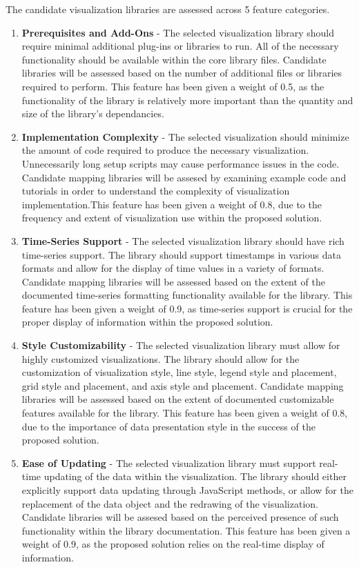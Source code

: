 \documentclass{report}
\begin{document}
The candidate visualization libraries are assessed across 5 feature categories.

\begin{enumerate}

\item \textbf{Prerequisites and Add-Ons} - The selected visualization library should require minimal additional plug-ins or libraries to run. All of the necessary functionality should be available within the core library files. Candidate libraries will be assessed based on the number of additional files or libraries required to perform. This feature has been given a weight of 0.5, as the functionality of the library is relatively more important than the quantity and size of the library's dependancies.

\item \textbf{Implementation Complexity} - The selected visualization should minimize the amount of code required to produce the necessary visualization. Unnecessarily long setup scripts may cause performance issues in the code. Candidate mapping libraries will be assesed by examining example code and tutorials in order to understand the complexity of visualization implementation.This feature has been given a weight of 0.8, due to the frequency and extent of visualization use within the proposed solution.

\item \textbf{Time-Series Support} - The selected visualization library should have rich time-series support. The library should support timestamps in various data formats and allow for the display of time values in a variety of formats. Candidate mapping libraries will be assessed based on the extent of the documented time-series formatting functionality available for the library. This feature has been given a weight of 0.9, as time-series support is crucial for the proper display of information within the proposed solution.

\item \textbf{Style Customizability} - The selected visualization library must allow for highly customized visualizations. The library should allow for the customization of visualization style, line style, legend style and placement, grid style and placement, and axis style and placement. Candidate mapping libraries will be assessed based on the extent of documented customizable features available for the library. This feature has been given a weight of 0.8, due to the importance of data presentation style in the success of the proposed solution.

\item \textbf{Ease of Updating} - The selected visualization library must support real-time updating of the data within the visualization. The library should either explicitly support data updating through JavaScript methods, or allow for the replacement of the data object and the redrawing of the visualization. Candidate libraries will be assesed based on the perceived presence of such functionality within the library documentation. This feature has been given a weight of 0.9, as the proposed solution relies on the real-time display of information.

\end{enumerate}
\end{document}
